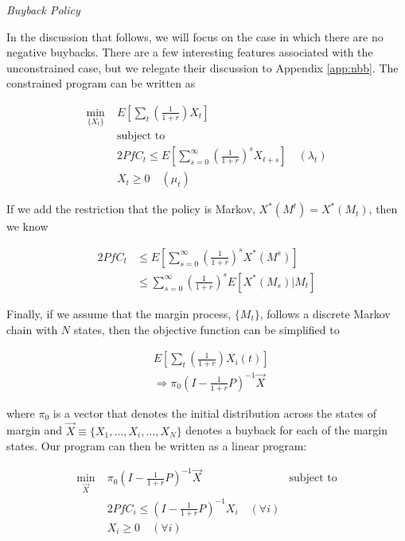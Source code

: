 \textit{Buyback Policy}

In the discussion that follows, we will focus on the case in which there are no negative buybacks.
There are a few interesting features associated with the unconstrained case, but we relegate their
discussion to Appendix \ref{app:nbb}. The constrained program can be written as

\begin{align*}
  \min_{\{X_t\}} \; & E \left[ \sum_{t} \left(\frac{1}{1 + r} \right) X_t \right] \\
  &\text{subject to} \\
  \quad & 2 PfC_t \leq E \left[ \sum_{s=0}^{\infty} \left(\frac{1}{1 + r}\right)^s X_{t+s} \right] \quad (\lambda_t) \\
  \quad & X_t \geq 0 \quad (\mu_t)
\end{align*}

If we add the restriction that the policy is Markov, $X^*(M^t) = X^*(M_t)$, then we know

\begin{align*}
  2 PfC_t &\leq E \left[ \sum_{s=0}^{\infty} \left( \frac{1}{1+r} \right)^s X^*(M^s) \right] \\
  &\leq \sum_{s=0}^{\infty} \left( \frac{1}{1+r} \right)^s E \left[X^*(M_s) | M_t \right]
\end{align*}

Finally, if we assume that the margin process, $\{M_t\}$, follows a discrete Markov chain with $N$
states, then the objective function can be simplified to

\begin{align*}
  &E \left[ \sum_{t} \left(\frac{1}{1 + r} \right) X_i(t) \right] \\
  &\Rightarrow \pi_0 (I - \frac{1}{1+r}P)^{-1} \vec{X}
\end{align*}

where $\pi_0$ is a vector that denotes the initial distribution across the states of margin and
$\vec{X} \equiv \{X_1, \dots, X_i, \dots, X_N\}$ denotes a buyback for each of the margin states.
Our program can then be written as a linear program:

\begin{align*}
  \min_{\vec{X}} \; & \pi_0 (I - \frac{1}{1+r}P)^{-1} \vec{X}
  &\text{subject to} \\
  \quad & 2 PfC_i \leq (I - \frac{1}{1 + r}P)^{-1} X_i \quad (\forall i) \\
  \quad & X_i \geq 0 \quad (\forall i)
\end{align*}

